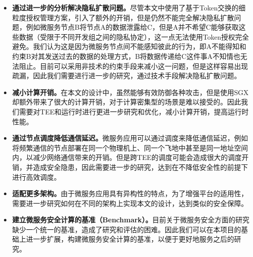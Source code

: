 \begin{itemize}
    \item \textbf{通过进一步的分析解决隐私扩散问题。}尽管本文中使用了基于Token交换的细粒度授权管理方案，引入了额外的开销，但是仍然不能完全解决隐私扩散问题，例如微服务节点B将节点A的数据泄露给C，但是A并不希望C能够获取这些数据（受限于不同开发组之间的隐私协定），这一点无法使用Token授权完全避免。我们认为这是因为微服务节点间不能感知彼此的行为，即A不能得知和约束B对其发送过去的数据的处理方式，B将数据传递给C这件事A不知情也无法阻止。目前可以采用非技术的约束手段来减小这一问题，但是这样容易出现疏漏，因此我们需要进行进一步的研究，通过技术手段解决隐私扩散问题。
    \item \textbf{减小计算开销。}在本文的设计中，虽然能够有效防御各种攻击，但是使用SGX却额外带来了很大的计算开销，对于计算密集型的场景是难以接受的。因此我们需要对TEE和运行时进行更进一步研究和优化，减小计算开销，提高运行时性能。
    \item \textbf{通过节点调度降低通信延迟。}微服务应用可以通过调度来降低通信延迟，例如将频繁通信的节点部署在同一个物理机上、同一个飞地中甚至是同一地址空间内，以减少网络通信带来的开销。但是跨TEE的调度可能会造成很大的调度开销，并造成安全隐患，因此需要进一步的研究，达到在不降低安全性的前提下进行高效调度。
    \item \textbf{适配更多架构。}由于微服务应用具有异构性的特点，为了增强平台的适用性，需要进一步研究如何在不同的架构上实现本文的设计，达到类似的安全保障。
    \item \textbf{建立微服务安全计算的基准（Benchmark）。}目前关于微服务安全方面的研究缺少一个统一的基准，造成了研究和评估的困难。因此我们可以在本项目的基础上进一步扩展，构建微服务安全计算的基准，以便于更好地服务之后的研究。
\end{itemize}
